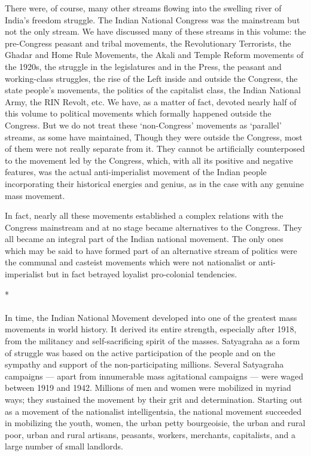 \begin{multicols}{2}
There were, of course, many other streams flowing into the swelling river of India's freedom struggle. The Indian National Congress was the mainstream but not the only stream. We have discussed many of these streams in this volume: the pre-Congress peasant and tribal movements, the Revolutionary Terrorists, the Ghadar and Home Rule Movements, the Akali and Temple Reform movements of the 1920s, the struggle in the legislatures and in the Press, the peasant and working-class struggles, the rise of the Left inside and outside the Congress, the state people's movements, the politics of the capitalist class, the Indian National Army, the RIN Revolt, etc. We have, as a matter of fact, devoted nearly half of this volume to political movements which formally happened outside the Congress. But we do not treat these `non-Congress' movements as `parallel' streams, as some have maintained, Though they were outside the Congress, most of them were not really separate from it. They cannot be artificially counterposed to the movement led by the Congress, which, with all its positive and negative features, was the actual anti-imperialist movement of the Indian people incorporating their historical energies and genius, as in the case with any genuine mass movement.

In fact, nearly all these movements established a complex relations with the Congress mainstream and at no stage became alternatives to the Congress. They all became an integral part of the Indian national movement. The only ones which may be said to have formed part of an alternative stream of politics were the communal and casteist movements which were not nationalist or anti-imperialist but in fact betrayed loyalist pro-colonial tendencies.

\begin{center}*\end{center}

\paragraph*{}
In time, the Indian National Movement developed into one of the greatest mass movements in world history. It derived its entire strength, especially after 1918, from the militancy and self-sacrificing spirit of the masses. Satyagraha as a form of struggle was based on the active participation of the people and on the sympathy and support of the non-participating millions. Several Satyagraha campaigns --- apart from innumerable mass agitational campaigns --- were waged between 1919 and 1942. Millions of men and women were mobilized in myriad ways; they sustained the movement by their grit and determination. Starting out as a movement of the nationalist intelligentsia, the national movement succeeded in mobilizing the youth, women, the urban petty bourgeoisie, the urban and rural poor, urban and rural artisans, peasants, workers, merchants, capitalists, and a large number of small landlords.


\end{multicols}
